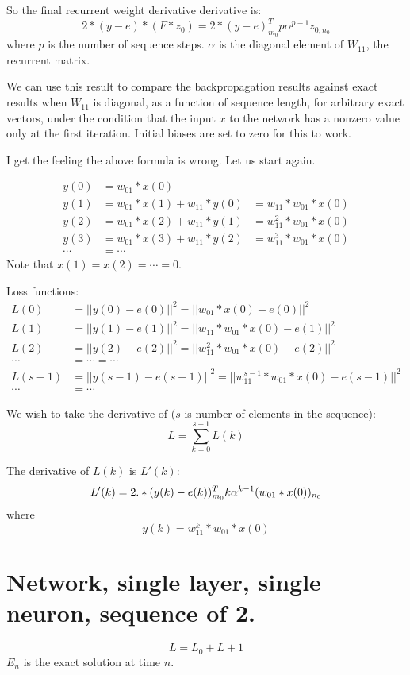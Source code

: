 \documentclass[11pt]{article}
\begin{document}
So the final recurrent weight derivative derivative is: 
$$
2*(y-e) * (F*z_0) = 2*(y-e)^T_{m_0} p \alpha^{p-1} z_{0,n_0}
$$
where $p$ is the number of sequence steps. $\alpha$ is the diagonal element of $W_{11}$, the recurrent matrix. 

We can use this result to compare the backpropagation results against exact results when $W_{11}$ is diagonal, as a function 
of sequence length, for arbitrary exact vectors, under the condition that the input $x$ to the network has a nonzero value
only at the first iteration. Initial biases are set to zero for this to work. 

I get the feeling the above formula is wrong. Let us start again. 

\begin{align}
y(0) &= w_{01}*x(0)  \\
y(1) &= w_{01}*x(1) + w_{11}*y(0) &= w_{11}*w_{01}*x(0) \\
y(2) &= w_{01}*x(2) + w_{11}*y(1) &= w_{11}^2*w_{01}*x(0)\\
y(3) &= w_{01}*x(3) + w_{11}*y(2) &= w_{11}^3*w_{01}*x(0)\\
\cdots &= \cdots 
\end{align}
Note that $x(1) = x(2) = \cdots = 0$. 

Loss functions: 
\begin{align}
L(0) &= ||y(0) - e(0)||^2 = ||w_{01}*x(0)-e(0)||^2\\
L(1) &= ||y(1) - e(1)||^2 = ||w_{11}*w_{01}*x(0) - e(1)||^2 \\
L(2) &= ||y(2) - e(2)||^2 = ||w_{11}^2*w_{01}*x(0) - e(2)||^2 \\
\cdots &= \cdots = \cdots \\
L(s-1) &= ||y(s-1) - e(s-1)||^2 = ||w_{11}^{s-1}*w_{01}*x(0) - e(s-1)||^2 \\
\cdots &= \cdots 
\end{align}

We wish to take the derivative of  ($s$ is number of elements in the sequence): 
$$
L = \sum_{k=0}^{s-1} L(k)
$$

The derivative of $L(k)$ is $L'(k)$: 
$$
L'(k) = 2.*(y(k)-e(k))^T_{m_0} k \alpha^{k-1} (w_{01}*x(0))_{n_0} \\
$$
where 
$$
y(k) = w_{11}^k * w_{01}*x(0)
$$

\section{Network, single layer, single neuron, sequence of 2.}
$$
L = L_0 + L+1
$$
$E_n$ is the exact solution at time $n$.
\end{document}
